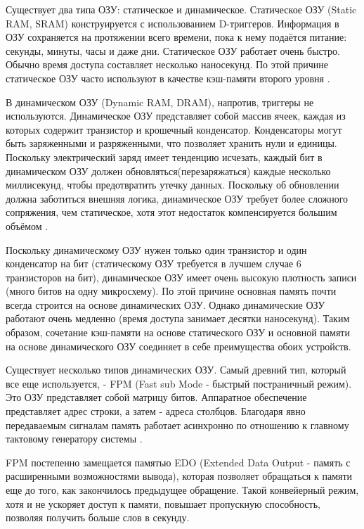 Существует два типа ОЗУ: статическое и динамическое. Статическое ОЗУ (Static RAM, SRAM) конструируется с использованием D-триггеров. Информация в ОЗУ сохраняется на протяжении всего времени, пока к нему подаётся питание: секунды, минуты, часы и даже дни. Статическое ОЗУ работает очень быстро. Обычно время доступа составляет несколько наносекунд. По этой причине статическое ОЗУ часто используют в качестве кэш-памяти второго уровня \cite{dram_tutorial2}.

В динамическом ОЗУ (Dynamic RAM, DRAM), напротив, триггеры не используются. Динамическое ОЗУ представляет собой массив ячеек, каждая из которых содержит транзистор и крошечный конденсатор. Конденсаторы могут быть заряженными и разряженными, что позволяет хранить нули и единицы. Поскольку электрический  заряд имеет тенденцию исчезать, каждый бит в динамическом ОЗУ должен обновляться(перезаряжаться) каждые несколько миллисекунд, чтобы предотвратить утечку данных. Поскольку об обновлении должна заботиться внешняя логика, динамическое ОЗУ требует более сложного сопряжения, чем статическое, хотя этот недостаток компенсируется большим объёмом \cite{dram_tutorial3}.

Поскольку динамическому ОЗУ нужен только один транзистор и один конденсатор на бит (статическому ОЗУ требуется в лучшем случае 6 транзисторов на бит), динамическое ОЗУ имеет очень высокую плотность записи (много битов на одну микросхему). По этой причине основная память почти всегда строится на основе динамических ОЗУ. Однако динамические ОЗУ работают очень медленно (время доступа занимает десятки наносекунд). Таким образом, сочетание кэш-памяти на основе статического ОЗУ и основной памяти на основе динамического ОЗУ соединяет в себе преимущества обоих устройств.

Существует несколько типов динамических ОЗУ. Самый древний тип, который все еще используется, - FPM (Fast sub Mode - быстрый постраничный режим). Это ОЗУ представляет собой матрицу битов. Аппаратное обеспечение представляет адрес строки, а затем - адреса столбцов. Благодаря явно передаваемым сигналам память работает асинхронно по отношению к главному тактовому генератору системы \cite{dram_book}.

FPM постепенно замещается памятью EDO (Extended Data Output - память с расширенными возможностями вывода), которая позволяет обращаться к памяти еще до того, как закончилось предыдущее обращение. Такой конвейерный режим, хотя и не ускоряет доступ к памяти, повышает пропускную способность, позволяя получить больше слов в секунду.


